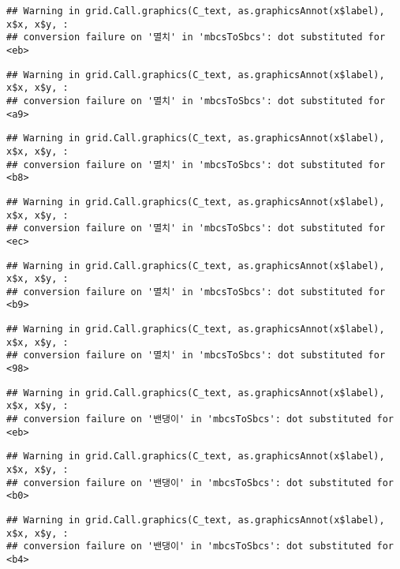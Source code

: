 \documentclass[
]{article}
\begin{document}
\begin{verbatim}
## Warning in grid.Call.graphics(C_text, as.graphicsAnnot(x$label), x$x, x$y, :
## conversion failure on '멸치' in 'mbcsToSbcs': dot substituted for <eb>
\end{verbatim}

\begin{verbatim}
## Warning in grid.Call.graphics(C_text, as.graphicsAnnot(x$label), x$x, x$y, :
## conversion failure on '멸치' in 'mbcsToSbcs': dot substituted for <a9>
\end{verbatim}

\begin{verbatim}
## Warning in grid.Call.graphics(C_text, as.graphicsAnnot(x$label), x$x, x$y, :
## conversion failure on '멸치' in 'mbcsToSbcs': dot substituted for <b8>
\end{verbatim}

\begin{verbatim}
## Warning in grid.Call.graphics(C_text, as.graphicsAnnot(x$label), x$x, x$y, :
## conversion failure on '멸치' in 'mbcsToSbcs': dot substituted for <ec>
\end{verbatim}

\begin{verbatim}
## Warning in grid.Call.graphics(C_text, as.graphicsAnnot(x$label), x$x, x$y, :
## conversion failure on '멸치' in 'mbcsToSbcs': dot substituted for <b9>
\end{verbatim}

\begin{verbatim}
## Warning in grid.Call.graphics(C_text, as.graphicsAnnot(x$label), x$x, x$y, :
## conversion failure on '멸치' in 'mbcsToSbcs': dot substituted for <98>
\end{verbatim}

\begin{verbatim}
## Warning in grid.Call.graphics(C_text, as.graphicsAnnot(x$label), x$x, x$y, :
## conversion failure on '밴댕이' in 'mbcsToSbcs': dot substituted for <eb>
\end{verbatim}

\begin{verbatim}
## Warning in grid.Call.graphics(C_text, as.graphicsAnnot(x$label), x$x, x$y, :
## conversion failure on '밴댕이' in 'mbcsToSbcs': dot substituted for <b0>
\end{verbatim}

\begin{verbatim}
## Warning in grid.Call.graphics(C_text, as.graphicsAnnot(x$label), x$x, x$y, :
## conversion failure on '밴댕이' in 'mbcsToSbcs': dot substituted for <b4>
\end{verbatim}
\end{document}
